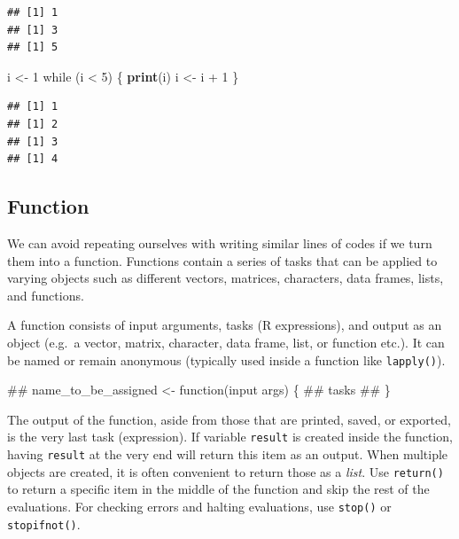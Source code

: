 \documentclass[]{book}
\newenvironment{Shaded}{\begin{snugshade}}{\end{snugshade}}
\newcommand{\KeywordTok}[1]{\textcolor[rgb]{0.13,0.29,0.53}{\textbf{{#1}}}}
\newcommand{\DecValTok}[1]{\textcolor[rgb]{0.00,0.00,0.81}{{#1}}}
\newcommand{\StringTok}[1]{\textcolor[rgb]{0.31,0.60,0.02}{{#1}}}
\newcommand{\NormalTok}[1]{{#1}}
\theoremstyle{definition}
\theoremstyle{definition}
\theoremstyle{remark}
\begin{document}
\begin{verbatim}
## [1] 1
## [1] 3
## [1] 5
\end{verbatim}

\begin{Shaded}
\begin{Highlighting}[]
\NormalTok{i <-}\StringTok{ }\DecValTok{1} 
\NormalTok{while (i <}\StringTok{ }\DecValTok{5}\NormalTok{) \{}
  \KeywordTok{print}\NormalTok{(i) }
  \NormalTok{i <-}\StringTok{ }\NormalTok{i +}\StringTok{ }\DecValTok{1}
\NormalTok{\}}
\end{Highlighting}
\end{Shaded}

\begin{verbatim}
## [1] 1
## [1] 2
## [1] 3
## [1] 4
\end{verbatim}

\subsection{Function}\label{function}

We can avoid repeating ourselves with writing similar lines of codes if
we turn them into a function. Functions contain a series of tasks that
can be applied to varying objects such as different vectors, matrices,
characters, data frames, lists, and functions.

A function consists of input arguments, tasks (R expressions), and
output as an object (e.g.~a vector, matrix, character, data frame, list,
or function etc.). It can be named or remain anonymous (typically used
inside a function like \texttt{lapply()}).

\begin{Shaded}
\begin{Highlighting}[]
\NormalTok{##  name_to_be_assigned  <- function(input args) \{}
\NormalTok{##                            tasks }
\NormalTok{##                           \}}
\end{Highlighting}
\end{Shaded}

The output of the function, aside from those that are printed, saved, or
exported, is the very last task (expression). If variable
\texttt{result} is created inside the function, having \texttt{result}
at the very end will return this item as an output. When multiple
objects are created, it is often convenient to return those as a
\emph{list}. Use \texttt{return()} to return a specific item in the
middle of the function and skip the rest of the evaluations. For
checking errors and halting evaluations, use \texttt{stop()} or
\texttt{stopifnot()}.
\end{document}
